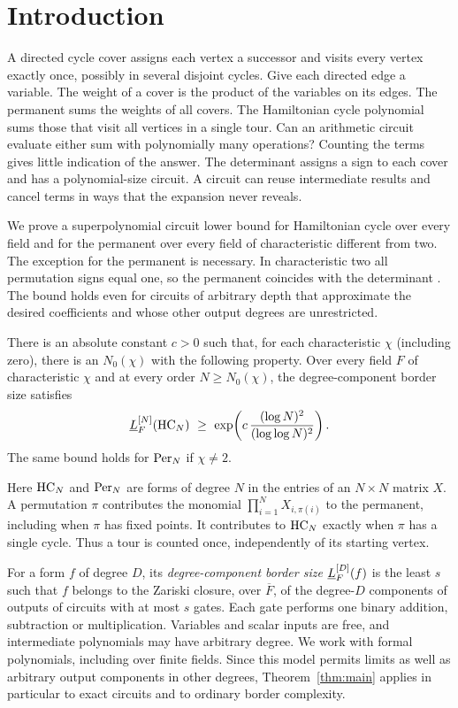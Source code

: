 \section{Introduction}\label{sec:intro}

A directed cycle cover assigns each vertex a successor and visits every
vertex exactly once, possibly in several disjoint cycles. Give each
directed edge a variable. The weight of a cover is the product of the
variables on its edges. The permanent sums the weights of all covers. The Hamiltonian
cycle polynomial sums those that visit all vertices in a single tour.
Can an arithmetic circuit evaluate either sum with polynomially many
operations? Counting the terms gives little indication of the answer.
The determinant assigns a sign to each cover and has a polynomial-size
circuit. A circuit can reuse intermediate results and cancel terms in
ways that the expansion never reveals.

We prove a superpolynomial circuit lower bound for Hamiltonian cycle
over every field and for the permanent over every field of
characteristic different from two. The exception for the permanent is
necessary. In characteristic two all permutation signs equal one,
so the permanent coincides with the determinant \cite{Berkowitz}.
The bound holds even for circuits of arbitrary depth that approximate
the desired coefficients and whose other output degrees are unrestricted.

\begin{theorem}\label{thm:main}
There is an absolute constant $c>0$ such that, for each characteristic
$\chi$ (including zero), there is an $N_0(\chi)$ with the following
property. Over every field $F$ of characteristic $\chi$ and at every
order $N\ge N_0(\chi)$, the degree-component border size satisfies
\[
  \underline L_F^{[N]}(\mathrm{HC}_N)\ \ge\
       \exp\!\left(c\,\frac{(\log N)^2}{(\log\log N)^2}\right).
\]
The same bound holds for $\mathrm{Per}_N$ if $\chi\ne2$.
\end{theorem}

Here $\mathrm{HC}_N$ and $\mathrm{Per}_N$ are forms of degree $N$ in the entries of
an $N\times N$ matrix $X$. A permutation $\pi$ contributes the
monomial $\prod_{i=1}^N X_{i,\pi(i)}$ to the permanent, including when
$\pi$ has fixed points. It contributes to $\mathrm{HC}_N$ exactly when $\pi$ has
a single cycle. Thus a tour is counted once, independently of its
starting vertex.

For a form $f$ of degree $D$, its \emph{degree-component border size}
$\underline L_F^{[D]}(f)$ is the least $s$ such that $f$ belongs to the Zariski
closure, over $\overline F$, of the degree-$D$ components of outputs
of circuits with at most $s$ gates. Each gate performs one binary
addition, subtraction or multiplication. Variables and scalar inputs
are free, and intermediate polynomials may have arbitrary degree.
We work with formal polynomials, including over finite fields. Since
this model permits limits as well as arbitrary output components in
other degrees, Theorem~\ref{thm:main} applies in particular to exact
circuits and to ordinary border complexity.

